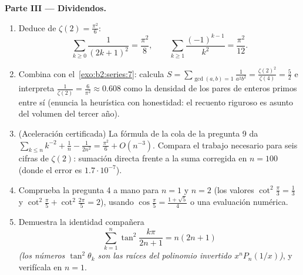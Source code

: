 \begin{problem}[{Problema de fin de semana --- $\zeta(2) = \pi^2/6$ y
el panorama de Bertrand}]
\medskip
\noindent\textbf{Parte III --- Dividendos.}
\begin{enumerate}[resume]
  \item Deduce de $\zeta(2) = \frac{\pi^2}6$:
        \[
        \sum_{k\geq0}\frac{1}{(2k+1)^2} = \frac{\pi^2}{8},
        \qquad
        \sum_{k\geq1}\frac{(-1)^{k-1}}{k^2} = \frac{\pi^2}{12}.
        \]
  \item Combina con el~\cref{exo:b2:series:7}: calcula $S =
        \sum_{\gcd(a,b)=1}\frac{1}{a^2b^2} =
        \frac{\zeta(2)^2}{\zeta(4)} = \frac52$ e interpreta
        $\frac{1}{\zeta(2)} = \frac{6}{\pi^2} \approx 0.608$ como la
        densidad de los pares de enteros primos entre sí (enuncia la
        heurística con honestidad: el recuento riguroso es asunto
        del volumen del tercer año).
  \item (Aceleración certificada) La fórmula de la cola de la
        pregunta 9 da $\sum_{k\leq n}k^{-2} + \frac1n -
        \frac1{2n^2} = \frac{\pi^2}6 + O(n^{-3})$. Compara el
        trabajo necesario para seis cifras de $\zeta(2)$: sumación
        directa frente a la suma corregida en $n = 100$ (donde el
        error es $1.7\cdot10^{-7}$).
  \item Comprueba la pregunta 4 a mano para $n = 1$ y $n = 2$ (los
        valores $\cot^2\frac\pi3 = \frac13$ y $\cot^2\frac\pi5 +
        \cot^2\frac{2\pi}5 = 2$), usando $\cos\frac\pi5 =
        \frac{1+\sqrt5}4$ o una evaluación numérica.
  \item Demuestra la identidad compañera
        \[
        \sum_{k=1}^{n}\tan^2\frac{k\pi}{2n+1} = n(2n+1)
        \]
        \emph{(los números $\tan^2\theta_k$ son las raíces del
        polinomio invertido $x^nP_n(1/x)$)}, y verifícala en $n =
        1$.
\end{enumerate}


\end{problem}
